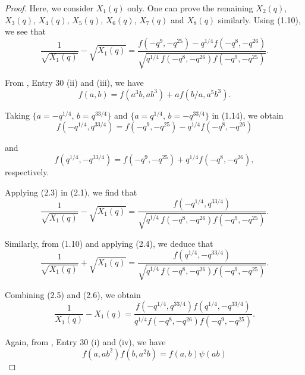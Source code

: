 \documentclass[11pt,a4paper]{article}
\numberwithin{equation}{section}
\theoremstyle{plain}
\begin{document}
	\begin{proof}
		Here, we consider $X_1(q)$ only. One can prove the remaining  $X_2(q)$, $X_3(q)$, $X_4(q)$, $X_5(q)$, $X_6(q)$, $X_7(q)$ and $X_8(q)$ similarly.
		Using (1.10), we see that
		\begin{equation}
			\frac{1}{\sqrt{X_1(q)}} - \sqrt{X_1(q)}
			=
			\frac{f(-q^{9},-q^{25})-q^{1/4}f(-q^{8},-q^{26})}
			{\sqrt{{q^{1/4}}\, f(-q^{8},-q^{26})f(-q^{9},-q^{25})}}.
			\tag{2.1}
		\end{equation}
		
		From \cite[p.~46]{Berndt}, Entry 30 (ii) and (iii), we have
		\begin{equation}
			f(a,b)=f(a^3b,ab^3)+af(b/a,a^5b^3).
			\tag{2.2}
		\end{equation}
		
		Taking $\{a=-q^{1/4},\, b=q^{33/4}\}$ and $\{a=q^{1/4},\, b=-q^{33/4}\}$ in (1.14), we obtain
		\begin{equation}
			f(-q^{1/4},q^{33/4})
			=
			f(-q^{9},-q^{25})-q^{1/4}f(-q^{8},-q^{26})
			\tag{2.3}
		\end{equation}
		
		
		and
		\begin{equation}
			f(q^{1/4},-q^{33/4})
			=
			f(-q^{9},-q^{25})+q^{1/4}f(-q^{8},-q^{26}),
			\tag{2.4}
		\end{equation}
		respectively.
		
		Applying (2.3) in (2.1), we find that
		\begin{equation}
			\frac{1}{\sqrt{X_1(q)}}-\sqrt{X_1(q)}
			=
			\frac{f(-q^{1/4},q^{33/4})}
			{\sqrt{{q^{1/4}}\, f(-q^{8},-q^{26})f(-q^{9},-q^{25})}}.
			\tag{2.5}
		\end{equation}
		
		Similarly, from (1.10) and applying (2.4), we deduce that
		\begin{equation}
			\frac{1}{\sqrt{X_1(q)}}+\sqrt{X_1(q)}
			=
			\frac{f(q^{1/4},-q^{33/4})}
			{\sqrt{{q^{1/4}}\, f(-q^{8},-q^{26})f(-q^{9},-q^{25})}}.
			\tag{2.6}
		\end{equation}
		
		Combining (2.5) and (2.6), we obtain
		\begin{equation}
			\frac{1}{X_1(q)}-X_1(q)
			=
			\frac{f(-q^{1/4},q^{33/4})f(q^{1/4},-q^{33/4})}
			{q^{1/4}f(-q^{8},-q^{26})f(-q^{9},-q^{25})}.
			\tag{2.7}
		\end{equation}
		
		Again, from \cite[p.~46]{Berndt}, Entry 30 (i) and (iv), we have
		\begin{equation}
			f(a,ab^2)f(b,a^2b)=f(a,b)\psi(ab)
			\tag{2.8}
		\end{equation}
		

\end{proof}
\end{document}
